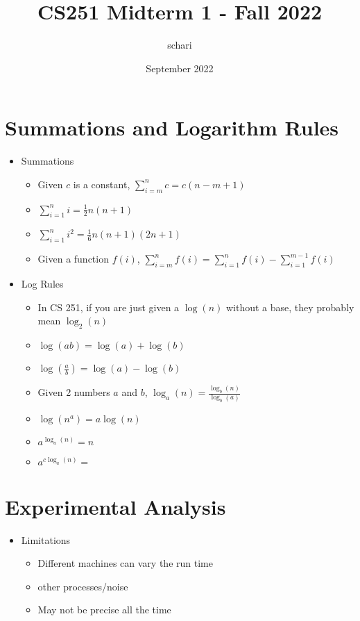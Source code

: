 \documentclass{article}
\title{CS251 Midterm 1 - Fall 2022}
\author{schari}
\date{September 2022}
\begin{document}
\maketitle

\section{Summations and Logarithm Rules}
\begin{itemize}
    \item Summations
    \begin{itemize}
        \item Given $c$ is a constant, $\sum_{i = m}^{n} c = c(n - m + 1)$
        \item $\sum_{i = 1}^{n} i = \frac{1}{2}n(n + 1)$
        \item $\sum_{i = 1}^{n} i^2 = \frac{1}{6}n(n + 1)(2n + 1)$
        \item Given a function $f(i)$, $\sum_{i = m}^{n} f(i) = \sum_{i = 1}^{n} f(i) - \sum_{i = 1}^{m - 1} f(i)$
    \end{itemize}
    \item Log Rules
    \begin{itemize}
        \item In CS 251, if you are just given a $\log(n)$ without a base, they probably mean $\log_2(n)$
        \item $\log(ab) = \log(a) + \log(b)$
        \item $\log(\frac{a}{b}) = \log(a) - \log(b)$
        \item Given 2 numbers $a$ and $b$, $\log_a(n) = \frac{\log_b(n)}{\log_b(a)}$
        \item $\log(n^a) = a \log(n)$
        \item $a^{\log_a(n)} = n$
        \item $a^{c \log_a(n)} = $
    \end{itemize}
\end{itemize}

\section{Experimental Analysis}

\begin{itemize}
    \item Limitations
        \begin{itemize}
            \item Different machines can vary the run time %
            \item other processes/noise
            \item May not be precise all the time 
        \end{itemize}
\end{itemize}
\end{document}
